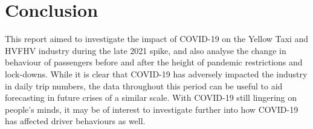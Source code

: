 \documentclass[11pt]{article}
\begin{document}
\section{Conclusion}
This report aimed to investigate the impact of COVID-19 on the Yellow Taxi and HVFHV industry during the late 2021 spike, and also analyse the change in behaviour of passengers before and after the height of pandemic restrictions and lock-downs. While it is clear that COVID-19 has adversely impacted the industry in daily trip numbers, the data throughout this period can be useful to aid forecasting in future crises of a similar scale. With COVID-19 still lingering on people's minds, it may be of interest to investigate further into how COVID-19 has affected driver behaviours as well.

\clearpage

\printbibliography
\end{document}
